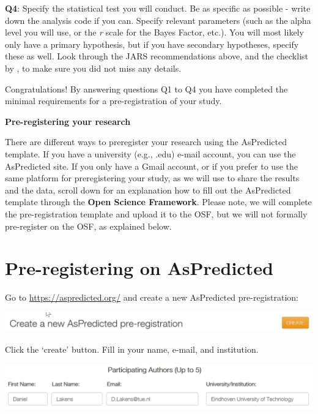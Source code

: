 \documentclass[
  oneside]{krantz}
\begin{document}
\textbf{Q4}: Specify the statistical test you will conduct. Be as specific as possible - write down the analysis code if you can. Specify relevant parameters (such as the alpha level you will use, or the \emph{r} scale for the Bayes Factor, etc.). You will most likely only have a primary hypothesis, but if you have secondary hypotheses, specify these as well. Look through the JARS recommendations above, and the checklist by \citet{wicherts_degrees_2016}, to make sure you did not miss any details.

Congratulations! By answering questions Q1 to Q4 you have completed the minimal requirements for a pre-registration of your study.

\textbf{Pre-registering your research}

There are different ways to preregister your research using the AsPredicted template. If you have a university (e.g., .edu) e-mail account, you can use the AsPredicted site. If you only have a Gmail account, or if you prefer to use the same platform for preregistering your study, as we will use to share the results and the data, scroll down for an explanation how to fill out the AsPredicted template through the \textbf{Open Science Framework}. Please note, we will complete the pre-registration template and upload it to the OSF, but we will not
formally pre-register on the OSF, as explained below.

\hypertarget{pre-registering-on-aspredicted}{%
\section{Pre-registering on AsPredicted}\label{pre-registering-on-aspredicted}}

Go to \url{https://aspredicted.org/} and create a new AsPredicted pre-registration:

\begin{center}\includegraphics[width=1\linewidth]{images/9fafdf4597839aeb44b3882aace1133e} \end{center}

Click the `create' button. Fill in your name, e-mail, and institution.

\begin{center}\includegraphics[width=1\linewidth]{images/1308ce9af6a5ebe700b8ff58542bdab2} \end{center}
\end{document}
